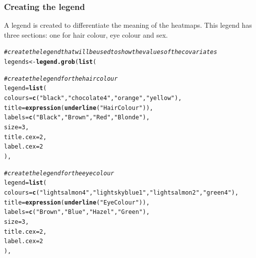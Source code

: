 \documentclass[letterpaper]{article}\usepackage[]{graphicx}\usepackage[]{color}
\makeatletter
\newcommand{\hlnum}[1]{\textcolor[rgb]{0.686,0.059,0.569}{#1}}%
\newcommand{\hlstr}[1]{\textcolor[rgb]{0.192,0.494,0.8}{#1}}%
\newcommand{\hlcom}[1]{\textcolor[rgb]{0.678,0.584,0.686}{\textit{#1}}}%
\newcommand{\hlstd}[1]{\textcolor[rgb]{0.345,0.345,0.345}{#1}}%
\newcommand{\hlkwb}[1]{\textcolor[rgb]{0.69,0.353,0.396}{#1}}%
\newcommand{\hlkwc}[1]{\textcolor[rgb]{0.333,0.667,0.333}{#1}}%
\newcommand{\hlkwd}[1]{\textcolor[rgb]{0.737,0.353,0.396}{\textbf{#1}}}%
\newenvironment{kframe}{%
 \def\at@end@of@kframe{}%
 \ifinner\ifhmode%
  \def\at@end@of@kframe{\end{minipage}}%
  \begin{minipage}{\columnwidth}%
 \fi\fi%
 \def\FrameCommand##1{\hskip\@totalleftmargin \hskip-\fboxsep
 \colorbox{shadecolor}{##1}\hskip-\fboxsep
     \hskip-\linewidth \hskip-\@totalleftmargin \hskip\columnwidth}%
 \MakeFramed {\advance\hsize-\width
   \@totalleftmargin\z@ \linewidth\hsize
   \@setminipage}}%
 {\par\unskip\endMakeFramed%
 \at@end@of@kframe}
\newenvironment{knitrout}{}{} %
\makeatother
\begin{document}
\subsubsection {Creating the legend}
A legend is created to differentiate the meaning of the heatmaps. This legend has three sections: one for hair colour, eye colour and sex.

\begin{knitrout}
\color{fgcolor}\begin{kframe}
\begin{alltt}
\hlcom{# create the legend that will be used to show the values of the covariates}
\hlstd{legends} \hlkwb{<-} \hlkwd{legend.grob}\hlstd{(} \hlkwd{list}\hlstd{(}

       \hlcom{# create the legend for the hair colour}
       \hlkwc{legend} \hlstd{=} \hlkwd{list}\hlstd{(}
               \hlkwc{colours} \hlstd{=} \hlkwd{c}\hlstd{(}\hlstr{"black"}\hlstd{,} \hlstr{"chocolate4"}\hlstd{,} \hlstr{"orange"}\hlstd{,} \hlstr{"yellow"}\hlstd{),}
               \hlkwc{title} \hlstd{=} \hlkwd{expression}\hlstd{(}\hlkwd{underline}\hlstd{(}\hlstr{"Hair Colour"}\hlstd{)),}
               \hlkwc{labels} \hlstd{=} \hlkwd{c}\hlstd{(}\hlstr{"Black"}\hlstd{,} \hlstr{"Brown"}\hlstd{,} \hlstr{"Red"}\hlstd{,} \hlstr{"Blonde"}\hlstd{),}
               \hlkwc{size} \hlstd{=} \hlnum{3}\hlstd{,}
               \hlkwc{title.cex} \hlstd{=} \hlnum{2}\hlstd{,}
               \hlkwc{label.cex} \hlstd{=} \hlnum{2}
               \hlstd{),}

       \hlcom{# create the legend for the eye colour}
       \hlkwc{legend} \hlstd{=} \hlkwd{list}\hlstd{(}
               \hlkwc{colours} \hlstd{=} \hlkwd{c}\hlstd{(}\hlstr{"lightsalmon4"}\hlstd{,} \hlstr{"lightskyblue1"}\hlstd{,} \hlstr{"lightsalmon2"}\hlstd{,} \hlstr{"green4"}\hlstd{),}
               \hlkwc{title} \hlstd{=} \hlkwd{expression}\hlstd{(}\hlkwd{underline}\hlstd{(}\hlstr{"Eye Colour"}\hlstd{)),}
               \hlkwc{labels} \hlstd{=} \hlkwd{c}\hlstd{(}\hlstr{"Brown"}\hlstd{,} \hlstr{"Blue"}\hlstd{,} \hlstr{"Hazel"}\hlstd{,} \hlstr{"Green"}\hlstd{),}
               \hlkwc{size} \hlstd{=} \hlnum{3}\hlstd{,}
               \hlkwc{title.cex} \hlstd{=} \hlnum{2}\hlstd{,}
               \hlkwc{label.cex} \hlstd{=} \hlnum{2}
               \hlstd{),}


\end{alltt}
\end{kframe}
\end{knitrout}
\end{document}
